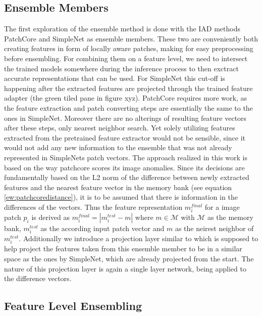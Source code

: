 \subsection{Ensemble Members}
\label{sec:ensemblecandidates}

The first exploration of the ensemble method is done with the IAD methods PatchCore \cite{patchCore2022} and SimpleNet \cite{liu2023simplenet} as ensemble members. These two 
are conveniently both creating features in form of locally aware patches, making for easy preprocessing before ensembling. For combining them on a 
feature level, we need to intersect the trained models somewhere during the inference process to then exctract accurate representations that can be used. 
For SimpleNet this cut-off is happening after the extracted features are projected through the trained feature adapter (the green tiled pane in figure xyz). 
PatchCore requires more work, as the feature extraction and patch converting steps are essentially the same to the ones in SimpleNet. Moreover there are no alterings of resulting feature vectors 
after these steps, only nearest neighbor search. Yet solely utilizing features extracted 
from the pretrained feature extractor would not be sensible, since it would not add any new information to the ensemble that was not already represented in SimpleNets patch vectors. 
The approach realized in this work is based on the way patchcore scores its image anomalies. Since its decisions are fundamentally based on the L2 norm of the difference between newly extracted 
features and the nearest feature vector in the memory bank (see equation \ref{ew:patchcoredistance}), it is to be assumed that there is information in the differences of the vectors. Thus the 
feature representation $m^{final}_i$ for a image patch $p_i$ is derived as $m^{final}_i = | m_i^{test} - m |$ where $m \in \mathcal{M}$ with $\mathcal{M}$ as the memory bank, $m_i^{test}$ as the 
according input patch vector and $m$ as the neirest neighbor of $m_i^{test}$. Additionally we introduce a projection layer similar to \cite{liu2023simplenet} which is supposed to help project the 
features taken from this ensemble member to be in a similar space as the ones by SimpleNet, which are already projected from the start. The nature of this projection layer is again a single 
layer network, being applied to the difference vectors.



\subsection{Feature Level Ensembling}
\label{sec:featurelevelensemble}

